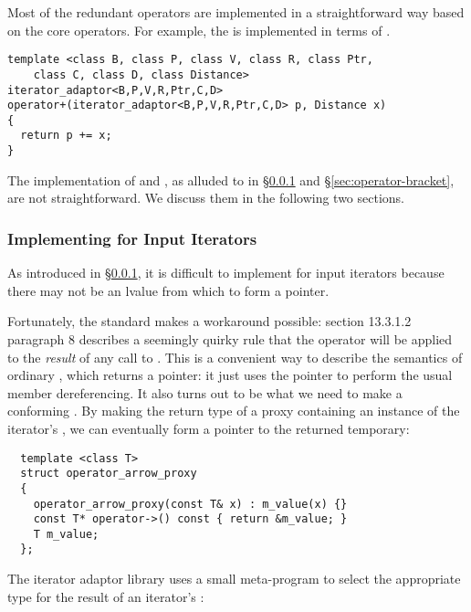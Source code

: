 \documentclass{netobjectdays}
\newcommand{\valuetype}{\code{value\_\-type}}
\begin{document}
Most of the redundant operators are implemented in a straightforward
way based on the core operators. For example, the  is
implemented in terms of .

{\footnotesize
\begin{verbatim}
template <class B, class P, class V, class R, class Ptr,
    class C, class D, class Distance>
iterator_adaptor<B,P,V,R,Ptr,C,D>
operator+(iterator_adaptor<B,P,V,R,Ptr,C,D> p, Distance x)
{
  return p += x;
}
\end{verbatim}
}

The implementation of  and , as
alluded to in \S\ref{sec:operator-arrow} and
\S\ref{sec:operator-bracket}, are not straightforward. We discuss them
in the following two sections.


\subsubsection{Implementing  for Input Iterators}
\label{sec:operator-arrow}

As introduced in \S\ref{sec:operator-arrow}, it is difficult to
implement  for input iterators because there may not
be an lvalue from which to form a pointer.

Fortunately, the standard makes a workaround possible: section
13.3.1.2 paragraph 8 describes a seemingly quirky rule that the
\code{->} operator will be applied to the \emph{result} of any call to
. This is a convenient way to describe the semantics
of ordinary , which returns a pointer: it just uses
the pointer to perform the usual member dereferencing. It also turns
out to be what we need to make a conforming
. By making the return type of
 a proxy containing an instance of the iterator's
\valuetype{}, we can eventually form a  pointer to
the returned temporary:

{\footnotesize
\begin{verbatim}
  template <class T>
  struct operator_arrow_proxy
  {
    operator_arrow_proxy(const T& x) : m_value(x) {}
    const T* operator->() const { return &m_value; }
    T m_value;
  };
\end{verbatim}
}

\noindent The iterator adaptor library uses a small meta-program to
select the appropriate type for the result of an iterator's
:
\end{document}
